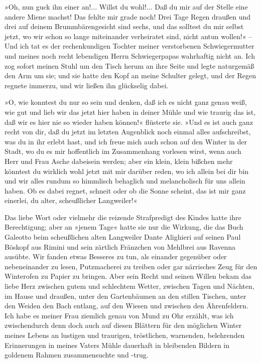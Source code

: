 »Oh, nun guck ihn einer an!... Willst du wohl!... Daß du mir auf
der Stelle eine andere Miene machst! Das fehlte mir grade noch!
Drei Tage Regen draußen und drei auf deinem Brummbärengesicht sind
sechs, und das solltest du mir selbst jetzt, wo wir schon so lange
miteinander verheiratet sind, nicht antun wollen!« – Und ich tat es
der rechenkundigen Tochter meiner verstorbenen Schwiegermutter und
meines noch recht lebendigen Herrn Schwiegerpapas wahrhaftig nicht
an. Ich zog sofort meinen Stuhl um den Tisch herum an ihre Seite
und legte naturgemäß den Arm um sie; und sie hatte den Kopf an
meine Schulter gelegt, und der Regen regnete immerzu, und wir
ließen ihn glückselig dabei.

»O, wie konntest du nur so sein und denken, daß ich es nicht ganz
genau weiß, wie gut und lieb wir das jetzt hier haben in deiner
Mühle und wie traurig das ist, daß wir es hier nie so wieder haben
können!« flüsterte sie. »Und es ist auch ganz recht von dir, daß du
jetzt im letzten Augenblick noch einmal alles aufschreibst, was du
in ihr erlebt hast, und ich freue mich auch schon auf den Winter in
der Stadt, wo du es mir hoffentlich im Zusammenhang vorlesen wirst,
wenn auch Herr und Frau Asche dabeisein werden; aber ein klein,
klein bißchen mehr könntest du wirklich wohl jetzt mit mir darüber
reden, wo ich allein bei dir bin und wir alles rundum so himmlisch
behaglich und melancholisch für uns allein haben. Ob es dabei
regnet, schneit oder ob die Sonne scheint, das ist mir ganz
einerlei, du alter, scheußlicher Langweiler!«

Das liebe Wort oder vielmehr die reizende Strafpredigt des Kindes
hatte ihre Berechtigung; aber an »jenem Tage« hatte sie nur die
Wirkung, die das Buch Galeotto beim scheußlichen alten Langweiler
Dante Alighieri auf seinen Paul Böskopf aus Rimini und sein
zärtlich Fränzchen von Mehlbrei aus Ravenna ausübte. Wir fanden
etwas Besseres zu tun, als einander gegenüber oder nebeneinander zu
lesen, Putzmacherei zu treiben oder gar närrisches Zeug für den
Winterofen zu Papier zu bringen. Aber sein Recht und seinen Willen
bekam das liebe Herz zwischen gutem und schlechtem Wetter, zwischen
Tagen und Nächten, im Hause und draußen, unter den Gartenbäumen an
den stillen Tischen, unter den Weiden den Bach entlang, auf den
Wiesen und zwischen den Ährenfeldern. Ich habe es meiner Frau
ziemlich genau von Mund zu Ohr erzählt, was ich zwischendurch denn
doch auch auf diesen Blättern für den möglichen Winter meines
Lebens an lustigen und traurigen, tröstlichen, warnenden,
belehrenden Erinnerungen in meines Vaters Mühle dauerhaft in
bleibenden Bildern in goldenem Rahmen zusammensuchte und -trug.

